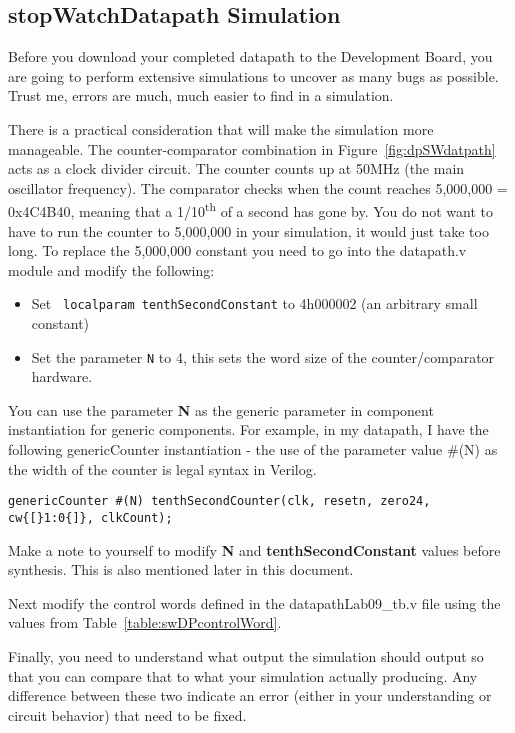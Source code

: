 \subsection{stopWatchDatapath Simulation}

Before you download your completed datapath to the Development Board,
you are going to perform extensive simulations to uncover as many bugs
as possible. Trust me, errors are much, much easier to find in a
simulation.

There is a practical consideration that will make the simulation more
manageable. The counter-comparator combination in Figure~\ref{fig:dpSWdatpath} acts as a
clock divider circuit. The counter counts up at 50MHz (the main
oscillator frequency). The comparator checks when the count reaches
5,000,000 = 0x4C4B40, meaning that a 1/10\textsuperscript{th} of a
second has gone by. You do not want to have to run the counter to
5,000,000 in your simulation, it would just take too long. To replace
the 5,000,000 constant you need to go into the datapath.v module and
modify the following:

\begin{itemize}
\item
Set \verb+ localparam tenthSecondConstant+ to 4\textquotesingle h000002
  (an arbitrary small constant)
\item
  Set the parameter \verb+N+ to 4, this sets the word size of the counter/comparator hardware.
\end{itemize}

You can use the parameter \textbf{N} as the generic parameter in
component instantiation for generic components. For example, in my
datapath, I have the following genericCounter instantiation - the use of
the parameter value \#(N) as the width of the counter is legal syntax in
Verilog.

\begin{verbatim}
genericCounter #(N) tenthSecondCounter(clk, resetn, zero24, cw{[}1:0{]}, clkCount);
\end{verbatim}

Make a note to yourself to modify \textbf{N} and
\textbf{tenthSecondConstant} values before synthesis. This is also
mentioned later in this document.

Next modify the control words defined in the datapathLab09\_tb.v file
using the values from Table~\ref{table:swDPcontrolWord}.

Finally, you need to understand what output the simulation should output
so that you can compare that to what your simulation actually producing.
Any difference between these two indicate an error (either in your
understanding or circuit behavior) that need to be fixed.

